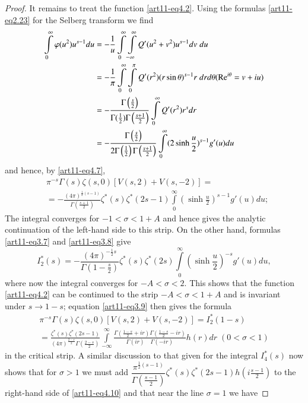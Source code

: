 \begin{proof}
It remains to treat the function \eqref{art11-eq4.2}. Using the formulas \eqref{art11-eq2.23} for the Selberg transform we find 
\begin{align*}
\int\limits^\infty_0 \varphi (u^2) u^{s-1} du & = - \frac{1}{u} \int\limits^\infty_{0} \int\limits^\infty_{-\infty} Q' (u^2 + v^2) u^{s-1} dv \; du\\
& = -\frac{1}{\pi} \int\limits^\infty_{0} \int\limits^\pi_0 Q'(r^2) (r \sin \theta)^{s-1}  r \; dr d \theta (\operatorname{Re}^{i\theta} = v + iu)\\
& = - \frac{\Gamma \left(\frac{s}{2} \right)}{\Gamma (\frac{1}{2}) \Gamma \left(\frac{s+1}{2} \right)} \int\limits^\infty_0 Q' (r^2) r^s dr\\
& = - \frac{\Gamma \left(\frac{s}{2} \right)}{2 \Gamma \left(\frac{1}{2} \right) \Gamma \left(\frac{s+1}{2} \right)} \int\limits^\infty_0 (2 \sinh \frac{u}{2})^{s-1} g' (u) du 
\end{align*}
and hence, by \eqref{art11-eq4.7},
\begin{align*}
& \pi^{-s} \Gamma (s) \zeta (s,0) [V(s,2) + V(s, -2)] =\\
& = - \frac{(4\pi)^{\frac{1}{2} (s-1)}}{\Gamma \left(\frac{s+1}{2} \right)} \zeta^\ast (s) \zeta^\ast(2s -1) \int\limits^\infty_0 \left(\sinh \frac{u}{2} \right)^{s-1} g' (u) du;
\end{align*}
The integral converges for $-1 <\sigma < 1 + A$ and hence gives the analytic continuation of the left-hand side to this strip. On the other hand, formulas \eqref{art11-eq3.7} and \eqref{art11-eq3.8} give
$$
I^\ast_2 (s) = - \frac{(4 \pi)^{-\frac{1}{2}s}}{\Gamma ( 1- \frac{s}{2})} \zeta^\ast (s) \zeta^\ast (2s) \int\limits^\infty_0 (\sinh \frac{u}{2})^{-s} g' (u) du, 
$$\pageoriginale 
where now the integral converges for $-A < \sigma < 2$. This shows that the function \eqref{art11-eq4.2} can be continued to the strip $-A <\sigma < 1+ A$ and is invariant under $s \to 1 -s$; equation \eqref{art11-eq3.9} then gives the formula
\begin{gather*}
\pi^{-s} \Gamma (s) \zeta (s,0) [V (s,2) + V (s,-2)] = I^\ast_2 (1-s) \tag{4.10}\label{art11-eq4.10}\\
= \frac{\zeta^\ast (s) \zeta^\ast (2s -1)}{(4 \pi)^{\frac{2-s}{2}} \Gamma \left(\frac{2-s}{2} \right)} \int\limits^\infty_{-\infty} \frac{\Gamma \left(\frac{1-s}{2} + ir \right) \Gamma \left(\frac{1-s}{2} - ir \right)}{\Gamma (ir) \quad \Gamma (-ir)} h (r) dr \; (0< \sigma <1)
\end{gather*}
in the critical strip. A similar discussion to that given for the integral $I^\ast_4(s)$ now shows that for $\sigma >1$ we must add $\dfrac{\pi^{\frac{1}{2}(s-1)}}{\Gamma \left(\frac{s-1}{2} \right)} \zeta^\ast (s) \zeta^\ast (2s -1) h\left(i \frac{s-1}{2} \right)$ to the right-hand side of \eqref{art11-eq4.10} and that near the line $\sigma =1$ we have 

\end{proof}
